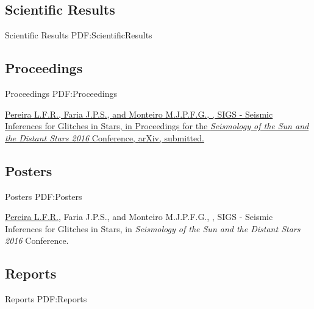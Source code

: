 \documentclass[letterpaper,10pt,oneside]{article}
\begin{document}
\begin{body}

\section
{Scientific Results}
{Scientific Results}
{PDF:ScientificResults}




\subsection
{Proceedings}
{Proceedings}
{PDF:Proceedings}

\GapNoBreak
{}
\href{}
{\underline{Pereira L.F.R.}, Faria J.P.S., and Monteiro M.J.P.F.G., 
, 
SIGS - Seismic Inferences for Glitches in Stars,
in Proceedings for the \textit{Seismology of the Sun and the Distant Stars 2016} Conference, \href{http://arxiv.org/abs/1703.04828} {arXiv}, submitted.}

\BigGap
\subsection
{Posters}
{Posters}
{PDF:Posters}

{\underline{Pereira L.F.R.}, Faria J.P.S., and Monteiro M.J.P.F.G., 
, 
SIGS - Seismic Inferences for Glitches in Stars,
in \textit{Seismology of the Sun and the Distant Stars 2016} Conference.}

\BigGap
\subsection
{Reports}
{Reports}
{PDF:Reports}


\end{body}
\end{document}
